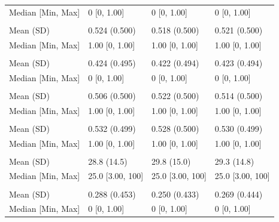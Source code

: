 \documentclass[smallextended]{svjour3}
\newenvironment{knitrout}{}{} %
\begin{document}
\begin{knitrout}
\begin{tabular}[t]{llll}
\hspace{1em}Median [Min, Max] & 0 [0, 1.00] & 0 [0, 1.00] & 0 [0, \vphantom{2} 1.00]\\
\addlinespace[0.3em]
\multicolumn{4}{l}{\textbf{z2}}\\
\hspace{1em}Mean (SD) & 0.524 (0.500) & 0.518 (0.500) & 0.521 (0.500)\\
\hspace{1em}Median [Min, Max] & 1.00 [0, 1.00] & 1.00 [0, 1.00] & 1.00 [0, \vphantom{2} 1.00]\\
\addlinespace[0.3em]
\multicolumn{4}{l}{\textbf{z3}}\\
\hspace{1em}Mean (SD) & 0.424 (0.495) & 0.422 (0.494) & 0.423 (0.494)\\
\hspace{1em}Median [Min, Max] & 0 [0, 1.00] & 0 [0, 1.00] & 0 [0, \vphantom{1} 1.00]\\
\addlinespace[0.3em]
\multicolumn{4}{l}{\textbf{z4}}\\
\hspace{1em}Mean (SD) & 0.506 (0.500) & 0.522 (0.500) & 0.514 (0.500)\\
\hspace{1em}Median [Min, Max] & 1.00 [0, 1.00] & 1.00 [0, 1.00] & 1.00 [0, \vphantom{1} 1.00]\\
\addlinespace[0.3em]
\multicolumn{4}{l}{\textbf{z5}}\\
\hspace{1em}Mean (SD) & 0.532 (0.499) & 0.528 (0.500) & 0.530 (0.499)\\
\hspace{1em}Median [Min, Max] & 1.00 [0, 1.00] & 1.00 [0, 1.00] & 1.00 [0, 1.00]\\
\addlinespace[0.3em]
\multicolumn{4}{l}{\textbf{size}}\\
\hspace{1em}Mean (SD) & 28.8 (14.5) & 29.8 (15.0) & 29.3 (14.8)\\
\hspace{1em}Median [Min, Max] & 25.0 [3.00, 100] & 25.0 [3.00, 100] & 25.0 [3.00, 100]\\
\addlinespace[0.3em]
\multicolumn{4}{l}{\textbf{grade3}}\\
\hspace{1em}Mean (SD) & 0.288 (0.453) & 0.250 (0.433) & 0.269 (0.444)\\
\hspace{1em}Median [Min, Max] & 0 [0, 1.00] & 0 [0, 1.00] & 0 [0, 1.00]\\

\end{tabular}
\end{knitrout}
\end{document}
